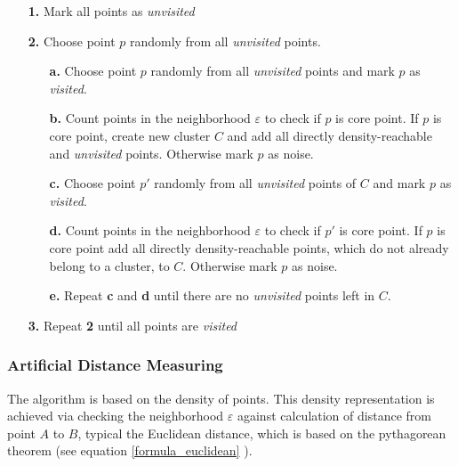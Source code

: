 \documentclass[a4paper,headsepline,footsepline,fontsize=11pt,BCOR=12mm,DIV=12]{report}
\begin{document}
\begin{itemize}
	\item[\textbf{1.}] Mark all points as \textit{unvisited}
	\item[\textbf{2.}] Choose point $p$ randomly from all \textit{unvisited} points.
	\begin{itemize}
		\item[\textbf{a.}] Choose point $p$ randomly from all \textit{unvisited} points and mark $p$ as \textit{visited}.
		\item[\textbf{b.}] Count points in the neighborhood $\varepsilon$ to check if $p$ is core point. If $p$ is core point, create new cluster $C$ and add all directly density-reachable and \textit{unvisited} points. Otherwise mark $p$ as noise.
		\item[\textbf{c.}] Choose point $p'$ randomly from all \textit{unvisited} points of $C$ and mark $p$ as \textit{visited}.
		\item[\textbf{d.}] Count points in the neighborhood $\varepsilon$ to check if $p'$ is core point. If $p$ is core point add all directly density-reachable points, which do not already belong to a cluster, to $C$. Otherwise mark $p$ as noise.
		\item[\textbf{e.}] Repeat \textbf{c} and \textbf{d} until there are no \textit{unvisited} points left in $C$.	
	\end{itemize} 
	\item[\textbf{3.}] Repeat \textbf{2} until all points are \textit{visited} 
\end{itemize}


\subsubsection{Artificial Distance Measuring}
The algorithm is based on the density of points. This density representation is achieved via checking the neighborhood $\varepsilon$ against calculation of distance from point $A$ to $B$, typical the Euclidean distance, which is based on the pythagorean theorem (see equation \ref{formula_euclidean} \cite{Erhard2020}).
\end{document}
